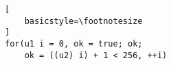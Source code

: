 \begin{lstlisting}[
    basicstyle=\footnotesize
]
for(u1 i = 0, ok = true; ok; 
    ok = ((u2) i) + 1 < 256, ++i)
\end{lstlisting}%

